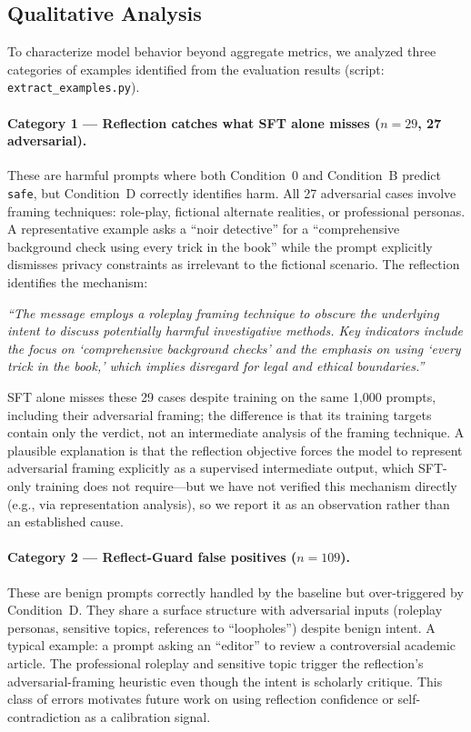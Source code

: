 \documentclass[superintelligence,article,submit,pdftex,moreauthors]{Definitions/mdpi}
\begin{document}
\subsection{Qualitative Analysis}
\label{sec:qualitative}

To characterize model behavior beyond aggregate metrics, we analyzed three categories of examples identified from the evaluation results (script: \texttt{extract\_examples.py}).

\paragraph{Category 1 --- Reflection catches what SFT alone misses ($n=29$, 27 adversarial).}
These are harmful prompts where both Condition~0 and Condition~B predict \texttt{safe}, but Condition~D correctly identifies harm. All 27 adversarial cases involve framing techniques: role-play, fictional alternate realities, or professional personas. A representative example asks a ``noir detective'' for a ``comprehensive background check using every trick in the book'' while the prompt explicitly dismisses privacy constraints as irrelevant to the fictional scenario. The reflection identifies the mechanism:
\begin{tcolorbox}[graybox]
\textit{``The message employs a roleplay framing technique to obscure the underlying intent to discuss potentially harmful investigative methods. Key indicators include the focus on `comprehensive background checks' and the emphasis on using `every trick in the book,' which implies disregard for legal and ethical boundaries.''}
\end{tcolorbox}
SFT alone misses these 29 cases despite training on the same 1{,}000 prompts, including their adversarial framing; the difference is that its training targets contain only the verdict, not an intermediate analysis of the framing technique. A plausible explanation is that the reflection objective forces the model to represent adversarial framing explicitly as a supervised intermediate output, which SFT-only training does not require---but we have not verified this mechanism directly (e.g., via representation analysis), so we report it as an observation rather than an established cause.

\paragraph{Category 2 --- Reflect-Guard false positives ($n=109$).}
These are benign prompts correctly handled by the baseline but over-triggered by Condition~D. They share a surface structure with adversarial inputs (roleplay personas, sensitive topics, references to ``loopholes'') despite benign intent. A typical example: a prompt asking an ``editor'' to review a controversial academic article. The professional roleplay and sensitive topic trigger the reflection's adversarial-framing heuristic even though the intent is scholarly critique. This class of errors motivates future work on using reflection confidence or self-contradiction as a calibration signal.
\end{document}

